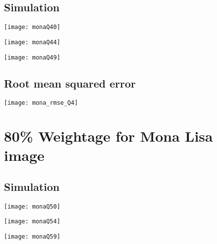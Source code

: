 \documentclass[a4paper, 12pt]{article}
\begin{document}
\subsection{Simulation}
\begin{center}
\begin{minipage}{0.45\linewidth}
    \texttt{[image: monaQ40]}
    \label{fig:Q1_1}
\end{minipage}
\hfill
\begin{minipage}{0.45\linewidth}
    \texttt{[image: monaQ44]}
    \label{fig:Q1_2}
\end{minipage}
\vspace{1.5 em}

\begin{minipage}{0.45\linewidth}
    \texttt{[image: monaQ49]}
    \label{fig:Q1_2}
\end{minipage}
\vspace{1.5 em}
\end{center}

\subsection{Root mean squared error}

\begin{center}
\begin{minipage}{0.5\linewidth}
    \texttt{[image: mona\_rmse\_Q4]}
    \label{fig:Q1_3}
\end{minipage}
\end{center}


\section{80\% Weightage for Mona Lisa image}
\subsection{Simulation}
\begin{center}
\begin{minipage}{0.45\linewidth}
    \texttt{[image: monaQ50]}
    \label{fig:Q1_1}
\end{minipage}
\hfill
\begin{minipage}{0.45\linewidth}
    \texttt{[image: monaQ54]}
    \label{fig:Q1_2}
\end{minipage}
\vspace{1.5 em}

\begin{minipage}{0.45\linewidth}
    \texttt{[image: monaQ59]}
    \label{fig:Q1_2}
\end{minipage}
\vspace{1.5 em}
\end{center}
\end{document}
